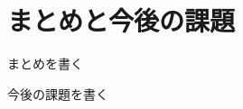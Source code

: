\documentclass[main]{subfiles}
\begin{document}
\chapter{まとめと今後の課題}
\label{cha:conclusion}

まとめを書く

今後の課題を書く
\end{document}
